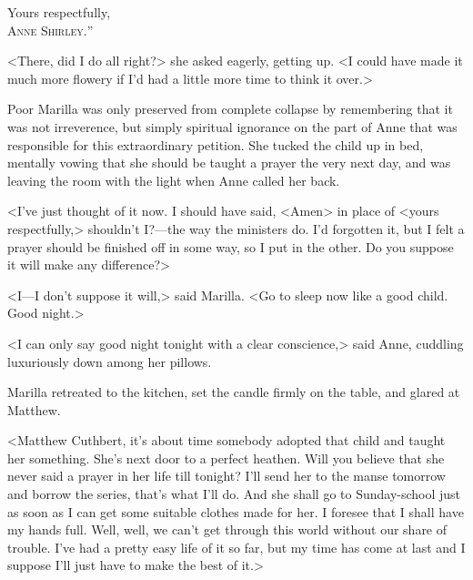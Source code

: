 \begin{flushright}
Yours respectfully,\\
\textsc{Anne Shirley.}”
\end{flushright}


<There, did I do all right?> she asked eagerly, getting up. <I could have made it much more flowery if I'd had a little more time to think it over.>

Poor Marilla was only preserved from complete collapse by remembering that it was not irreverence, but simply spiritual ignorance on the part of Anne that was responsible for this extraordinary petition. She tucked the child up in bed, mentally vowing that she should be taught a prayer the very next day, and was leaving the room with the light when Anne called her back.

<I've just thought of it now. I should have said, <Amen> in place of <yours respectfully,> shouldn't I\@?—the way the ministers do. I'd forgotten it, but I felt a prayer should be finished off in some way, so I put in the other. Do you suppose it will make any difference?>

<I—I don't suppose it will,> said Marilla. <Go to sleep now like a good child. Good night.>

<I can only say good night tonight with a clear conscience,> said Anne, cuddling luxuriously down among her pillows.

Marilla retreated to the kitchen, set the candle firmly on the table, and glared at Matthew.

<Matthew Cuthbert, it's about time somebody adopted that child and taught her something. She's next door to a perfect heathen. Will you believe that she never said a prayer in her life till tonight? I'll send her to the manse tomorrow and borrow the  series, that's what I'll do. And she shall go to Sunday-school just as soon as I can get some suitable clothes made for her. I foresee that I shall have my hands full. Well, well, we can't get through this world without our share of trouble. I've had a pretty easy life of it so far, but my time has come at last and I suppose I'll just have to make the best of it.>